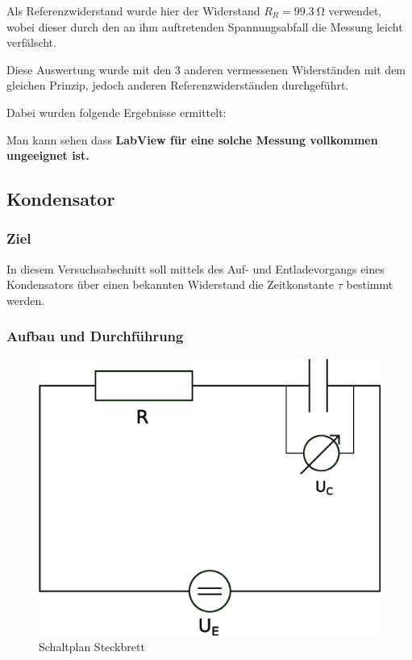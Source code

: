 \documentclass[12pt,twoside,a4paper]{scrartcl}
\begin{document}
				Als Referenzwiderstand wurde hier der Widerstand $R_R = \SI{99.3}{\ohm}$ verwendet, wobei dieser durch den an ihm auftretenden Spannungsabfall die Messung leicht verfälscht.

				Diese Auswertung wurde mit den 3 anderen vermessenen Widerständen mit dem gleichen Prinzip, jedoch anderen Referenzwiderständen durchgeführt.

				Dabei wurden folgende Ergebnisse ermittelt:

					

				Man kann sehen dass \textbf{LabView für eine solche Messung vollkommen ungeeignet ist.}


		\subsection{Kondensator}
			\subsubsection{Ziel}
				In diesem Versuchsabschnitt soll mittels des Auf- und Entladevorgangs eines Kondensators über einen bekannten Widerstand die Zeitkonstante $\tau$ bestimmt werden.

			\subsubsection{Aufbau und Durchführung}

			\begin{figure}[H]
				\centering

				\includegraphics[width = 0.8 \textwidth]{Pictures/capacitance}

				\caption{Schaltplan Steckbrett}
			\end{figure}
\end{document}
